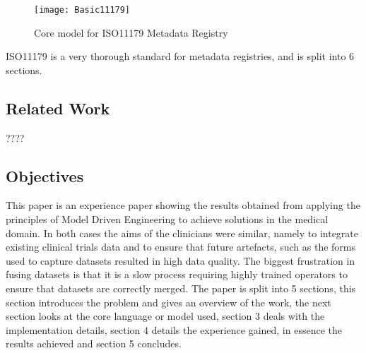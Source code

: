 \begin{figure}[here]
	\texttt{[image: Basic11179]}
	\caption{Core model for ISO11179 Metadata Registry} 
	\label{fig:basicMDR}
\end{figure}

ISO11179 is a very thorough standard for metadata registries, and is split into 6 sections.

\subsection{Related Work}
????

\subsection{Objectives}
This paper is an experience paper showing the results obtained from applying the principles of Model Driven Engineering to achieve solutions in the medical domain. In both cases the aims of the clinicians were similar, namely to integrate existing clinical trials data and to ensure that future artefacts, such as the forms used to capture datasets resulted in high data quality. The biggest frustration in fusing datasets is that it is a slow process requiring highly trained operators to ensure that datasets are correctly merged. 
The paper is split into 5 sections, this section introduces the problem and gives an overview of the work, the next section looks at the core language or model used, section 3 deals with the implementation details, section 4 details the experience gained, in essence the results achieved and section 5 concludes.

